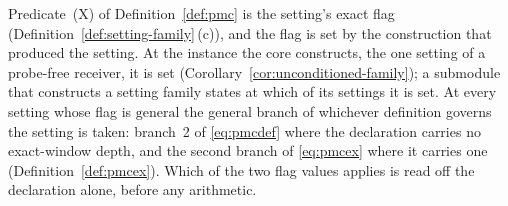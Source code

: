 
\begin{remark}
\label{rem:flag-instances}
Predicate~(X) of Definition~\ref{def:pmc} is the setting's exact flag
(Definition~\ref{def:setting-family}\,(c)), and the flag is set by the
construction that produced the setting. At the instance the core
constructs, the one setting of a probe-free receiver, it is set
(Corollary~\ref{cor:unconditioned-family}); a submodule that constructs a
setting family states at which of its settings it is set. At every setting
whose flag is $\mathrm{general}$ the general branch of whichever definition
governs the setting is taken: branch~2 of \eqref{eq:pmcdef} where the declaration
carries no exact-window depth, and the second branch of
\eqref{eq:pmcex} where it carries one (Definition~\ref{def:pmcex}). Which of
the two flag values applies is read off the declaration alone, before any
arithmetic.
\end{remark}

